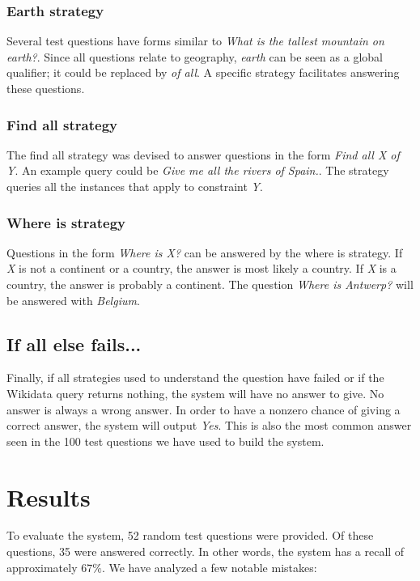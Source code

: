 \documentclass{article}
\begin{document}
\subsubsection{Earth strategy}
Several test questions have forms similar to \emph{What is the tallest mountain on earth?}. Since all questions relate to geography, \emph{earth} can be seen as a global qualifier; it could be replaced by \emph{of all}. A specific strategy facilitates answering these questions.

\subsubsection{Find all strategy}
The find all strategy was devised to answer questions in the form \emph{Find all X of Y}. An example query could be \emph{Give me all the rivers of Spain.}. The strategy queries all the instances that apply to constraint \emph{Y}.

\subsubsection{Where is strategy}
Questions in the form \emph{Where is X?} can be answered by the where is strategy. If \emph{X} is not a continent or a country, the answer is most likely a country. If \emph{X} is a country, the answer is probably a continent. The question \emph{Where is Antwerp?} will be answered with \emph{Belgium}.

\subsection{If all else fails...}
Finally, if all strategies used to understand the question have failed or if the Wikidata query returns nothing, the system will have no answer to give. No answer is always a wrong answer. In order to have a nonzero chance of giving a correct answer, the system will output \emph{Yes}. This is also the most common answer seen in the 100 test questions we have used to build the system.

\section{Results}
To evaluate the system, 52 random test questions were provided. Of these questions, 35 were answered correctly. In other words, the system has a recall of approximately $67\%$. We have analyzed a few notable mistakes:
\end{document}
